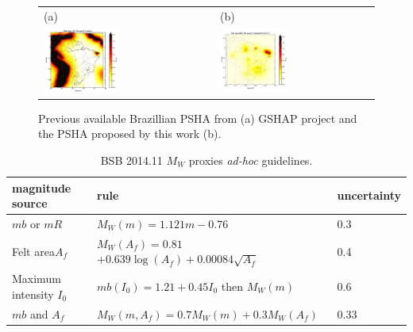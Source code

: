 \documentclass[draft, grl]{agutex}
\begin{document}
\begin{figure}
	\begin{center}
	\begin{table}[H]
		\begin{tabular}{ p{} p{} }
		\footnotesize(a)
		&
		\footnotesize(b)
		\\
		\includegraphics[width=0.45\textwidth]{z_img_pga_gshap} &
		\includegraphics[width=0.45\textwidth]{z_img_pga_helmstetter}
		\end{tabular}
	\end{table}
	\caption{Previous available Brazillian PSHA from (a) GSHAP project and the PSHA proposed by this work (b). }
	\label{placeholder}
	\end{center}
\end{figure}



\begin{table}[H]
	\caption{BSB 2014.11 $M_W$ proxies \emph{ad-hoc} guidelines.}
	\begin{tabular}{l l l}
		\hline
		\textbf{magnitude source} & \textbf{rule} & \textbf{uncertainty}\\
		\hline
		$mb$ or $mR$
		&$ M_W(m) = 1.121 m - 0.76 $
		& 0.3 \\
		Felt area$A_f$
		&$ M_W(A_f) = 0.81 $$    + 0.639\log(A_f) + 0.00084\sqrt{A_f}$& 0.4 \\
		Maximum intensity $I_0$
		& $mb(I_0) = 1.21 + 0.45 I_0$ then $M_W(m)$
		& 0.6 \\
		$mb$ and $A_f$
		& $M_W(m, A_f) = 0.7 M_W(m) + 0.3 M_W(A_f)$
		& 0.33 \\
		\hline
	\end{tabular}
	\label{tab:guidelines}
\end{table}
\end{document}
